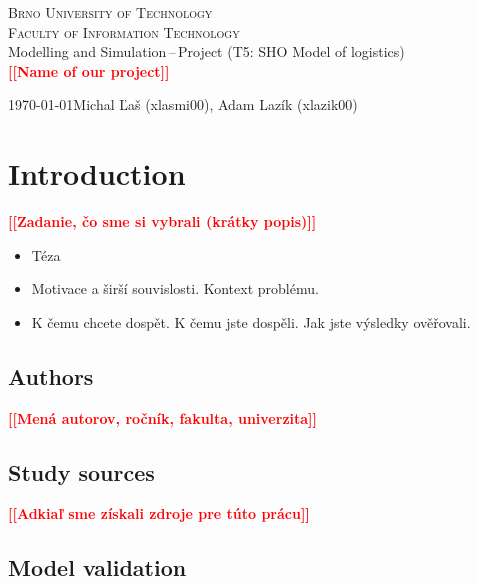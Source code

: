 \documentclass[a4paper, 11pt, a4paper]{article}
\newcommand{\todo}[1]{\textcolor{red}{\textbf{[[#1]]}}}
\begin{document}
\begin{titlepage}
    \begin{center}
            \textsc{\Huge Brno University of Technology \\}
            \vspace{0.5em}
            \textsc{\huge Faculty of Information Technology \\}
            {\LARGE 	Modelling and Simulation\,--\,Project (T5: SHO Model of logistics) \\ 
            \vspace{0.4em}
            \Huge \todo{Name of our project}}
    \end{center}
    {\Large \today \hfill Michal Ľaš (xlasmi00), Adam Lazík (xlazik00)}
\end{titlepage}

\tableofcontents
\newpage

\section{Introduction}

\noindent\todo{Zadanie, čo sme si vybrali (krátky popis)\cite{placeholder.cite}}

\begin{itemize}
    \item Téza
    \item Motivace a širší souvislosti. Kontext problému.
    \item K čemu chcete dospět. K čemu jste dospěli. Jak jste výsledky
    ověřovali.
\end{itemize}

\subsection{Authors}

\noindent\todo{Mená autorov, ročník, fakulta, univerzita}


\subsection{Study sources}

\noindent\todo{Adkiaľ sme získali zdroje pre túto prácu}


\subsection{Model validation}
\end{document}
